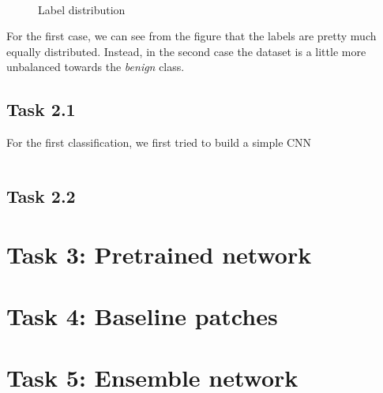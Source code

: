 \documentclass[11pt,a4paper,oneside]{article}
\begin{document}
\begin{figure}[htbp]
\centering
	 \quad
	 \\
\caption{Label distribution}
\label{fig:label distribution}
\end{figure}

For the first case, we can see from the figure that the labels are pretty much equally distributed. Instead, in the second case the dataset is a little more unbalanced towards the \textit{benign} class.

\subsection{Task 2.1}
For the first classification, we first tried to build a simple CNN 

\begin{verbatim}

\end{verbatim}

\subsection{Task 2.2}


\section{Task 3: Pretrained network}


\section{Task 4: Baseline patches}


\section{Task 5: Ensemble network}
\end{document}
